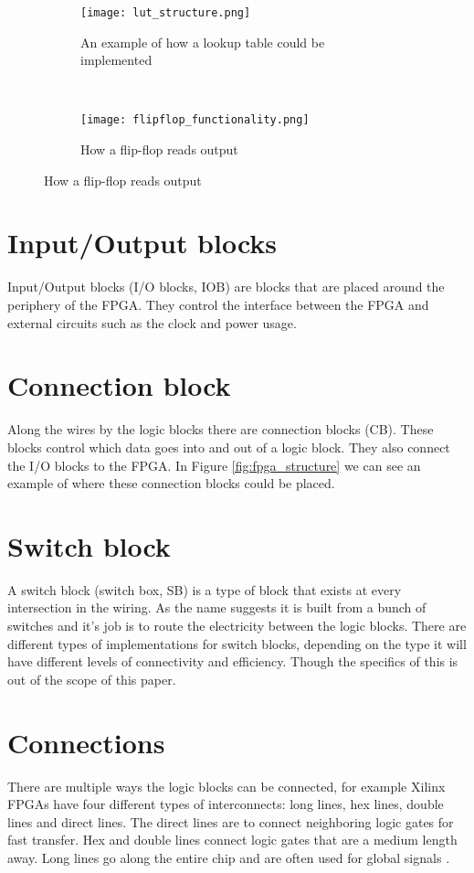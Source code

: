 \begin{figure}[H]
    \begin{subfigure}[b]{.4\textwidth}
        \centering
        \texttt{[image: lut\_structure.png]}
        \caption{An example of how a lookup table could be implemented}
        \label{fig:lut_flipflop}
    \end{subfigure}
    ~
    \centering
    \begin{subfigure}[b]{.4\textwidth}
        \centering
        \texttt{[image: flipflop\_functionality.png]}
        \caption{How a flip-flop reads output}
        \label{fig:flipflop_func}
    \end{subfigure}
\end{figure}


\section{Input/Output blocks}
Input/Output blocks (I/O blocks, IOB) are blocks that are placed around the
periphery of the FPGA. They control the interface between the FPGA and external
circuits such as the clock and power usage.

\section{Connection block}
Along the wires by the logic blocks there are connection blocks (CB). These blocks
control which data goes into and out of a logic block. They also connect the
I/O blocks to the FPGA. In Figure \ref{fig:fpga_structure} we can see an
example of where these connection blocks could be placed.

\section{Switch block}
A switch block (switch box, SB) is a type of block that exists at every
intersection in the wiring. As the name suggests it is built from a bunch of
switches and it's job is to route the electricity between the logic blocks.
There are different types of implementations for switch blocks, depending on
the type it will have different levels of connectivity and efficiency. Though
the specifics of this is out of the scope of this paper.

\section{Connections}
There are multiple ways the logic blocks can be connected, for example Xilinx
FPGAs have four different types of interconnects: long lines, hex lines, double
lines and direct lines. The direct lines are to connect neighboring logic gates
for fast transfer. Hex and double lines connect logic gates that are a medium
length away. Long lines go along the entire chip and are often used for global
signals \citep{HideharuAmano8}.


